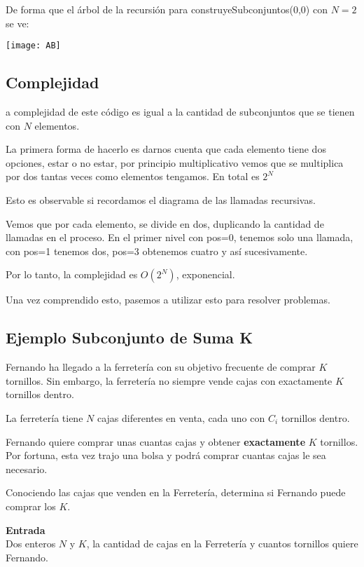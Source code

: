 De forma que el árbol de la recursión para construyeSubconjuntos(0,0) con \(N=2\) se ve:

\begin{center}
	\texttt{[image: AB]}
\end{center} 

\subsection{Complejidad}

a complejidad de este código es igual a la cantidad de subconjuntos que se tienen con \(N\) elementos.

La primera forma de hacerlo es darnos cuenta que cada elemento tiene dos opciones, estar o no estar, por principio multiplicativo vemos que se multiplica por dos tantas veces como elementos tengamos. En total es \(2^N\) 

Esto es observable si recordamos el diagrama de las llamadas recursivas.

Vemos que por cada elemento, se divide en dos, duplicando la cantidad de llamadas en el proceso. En el primer nivel con pos=0, tenemos solo una llamada, con pos=1 tenemos dos, pos=3 obtenemos cuatro y así sucesivamente.

Por lo tanto, la complejidad es \(O(2^N)\), exponencial.

Una vez comprendido esto, pasemos a utilizar esto para resolver problemas.

\subsection*{Ejemplo Subconjunto de Suma K}
Fernando ha llegado a la ferretería con su objetivo frecuente de comprar \(K\) tornillos.  Sin embargo, la ferretería no siempre vende cajas con exactamente \(K\) tornillos dentro.

La ferretería tiene \(N\) cajas diferentes en venta, cada uno con \(C_i\) tornillos dentro.

Fernando quiere comprar unas cuantas cajas y obtener \textbf{exactamente} \(K\) tornillos. Por fortuna, esta vez trajo una bolsa y podrá comprar cuantas cajas le sea necesario.

Conociendo las cajas que venden en la Ferretería, determina si Fernando puede comprar los \(K\).

\textbf{Entrada}\\
Dos enteros \(N\) y \(K\), la cantidad de cajas en la Ferretería y cuantos tornillos quiere Fernando.

